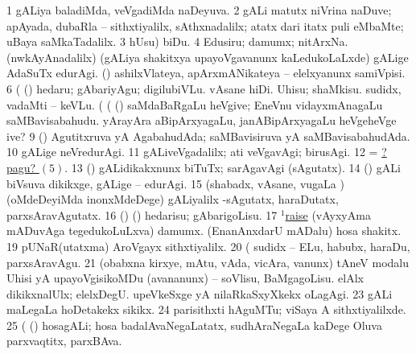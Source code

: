 \noindent 
\gl{\pagu}
\bmng
\bnum
\num{1}  gALiya baladiMda, veVgadiMda naDeyuva. 
\num{2}  gALi matutx niVrina naDuve; apAyada, dubaRla -- sithxtiyalilx, sAthxnadalilx; atatx dari itatx puli eMbaMte; uBaya saMkaTadalilx. 
\num{3}  hUsu) biDu. 
\num{4}  Edusiru; damumx; nitArxNa. 
\hypertarget{wind pagu5}{} 
  
\banum
{} (nwkAyAnadalilx) (gALiya shakitxya upayoVgavanunx kaLedukoLaLxde) gALige AdaSuTx edurAgi. 
 (\rUpa) ashilxVlateya, apArxmANikateya -- elelxyanunx samiVpisi. 
\eanum
\numie
\num{6}  (  (\AmA) hedaru; gAbariyAgu; digilubiVLu. 
  
\banum
{} vAsane hiDi. 
 Uhisu; shaMkisu. 
 sudidx, vadaMti -- keVLu. 
\eanum
\numie
{}  (  (  (\rUpa) 
\banum
{} saMdaBaRgaLu heVgive; EneVnu vidayxmAnagaLu saMBavisabahudu. 
 yArayAra aBipArxyagaLu, janABipArxyagaLu heVgeheVge ive? 
\eanum
\numie
\num{9}  (\rUpa) Agutitxruva yA AgabahudAda; saMBavisiruva yA saMBavisabahudAda. 
\num{10}  gALige neVredurAgi. 
\num{11}  gALiveVgadalilx; ati veVgavAgi; birusAgi. 
\num{12}  = \hyperlink{wind pagu5}{?pagu? \((5)\)}. 
\num{13}  (\nw) gALidikakxnunx biTuTx; sarAgavAgi (sAgutatx). 
\num{14}  (\nw) gALi biVsuva dikikxge, gALige -- edurAgi. 
\num{15}  (shabadx, vAsane, \mo vugaLa \vi) (oMdeDeyiMda inonxMdeDege) gALiyalilx -sAgutatx, haraDutatx, parxsAravAgutatx. 
\num{16}  (\AmA) (\ashi) hedarisu; gAbarigoLisu. 
\num{17} \hyperref{kandict_r.pdf}{R}{raise(1) pagu(16)}{$^1$raise}  
  
\banum
{} (vAyxyAma mADuvAga tegedukoLuLxva) damumx. 
 (EnanAnxdarU mADalu) hosa shakitx. 
\eanum
\numie
\num{19}  pUNaR(utatxma) AroVgayx sithxtiyalilx. 
\num{20}  (  sudidx -- ELu, habubx, haraDu, parxsAravAgu. 
\num{21}  (obabxna kirxye, mAtu, vAda, vicAra, \mo vanunx) tAneV modalu Uhisi yA upayoVgisikoMDu (avananunx) -- soVlisu, BaMgagoLisu. 
  
\banum
{} elAlx dikikxnalUlx; elelxDegU. 
 upeVkeSxge yA nilaRkaSxyXkekx oLagAgi. 
\eanum
\numie
\num{23}  gALi maLegaLa hoDetakekx sikikx. 
\num{24}  parisithxti hAguMTu; viSaya A sithxtiyalilxde. 
\num{25}  (  (\rUpa) hosagALi; hosa badalAvaNegaLatatx, sudhAraNegaLa kaDege Oluva parxvaqtitx, parxBAva. 
\enum
\emng
\eentry

